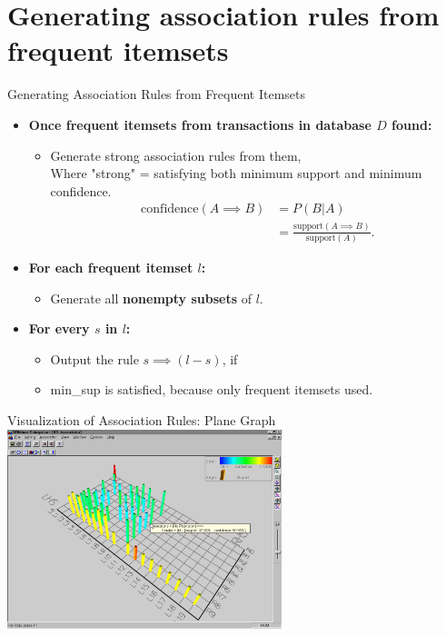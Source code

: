 \section{Generating association rules from frequent itemsets}

\begin{frame}{Generating Association Rules from Frequent Itemsets}
	\begin{itemize}
		\item \textbf{Once frequent itemsets from transactions in 
			database $D$ found:}
		\begin{itemize}
			\item Generate strong association rules from them,\\
			Where "strong" = satisfying both minimum support and 
			minimum confidence.
			\begin{align}
				\text{confidence}(A \implies B) & = 
				P(B|A)                          \\
				& = \frac{\text{support}(A \implies 
					B)}{\text{support}(A)}.
			\end{align}
		\end{itemize}
		\item \textbf{For each frequent itemset $l$:}
		\begin{itemize}
			\item Generate all \textbf{nonempty subsets} of $l$.
		\end{itemize}
		\item \textbf{For every $s$ in $l$:}
		\begin{itemize}
			\item Output the rule $s \implies (l - s)$, if
			\item min\_sup is satisfied, because only frequent itemsets 
			used.
		\end{itemize}
	\end{itemize}
\end{frame}

\begin{frame}{Visualization of Association Rules: Plane Graph}
	\includegraphics[width=0.6\textwidth]{img/assoc_rules1.jpg}
\end{frame}

